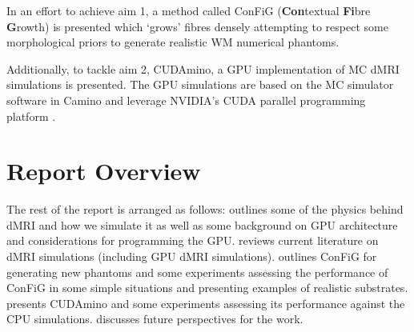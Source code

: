 In an effort to achieve aim 1, a method called \acs{ConFiG} (\textbf{Con}textual \textbf{Fi}bre \textbf{G}rowth) is presented which `grows' fibres densely attempting to respect some morphological priors to generate realistic \ac{WM} numerical phantoms.


Additionally, to tackle aim 2, CUDAmino, a \ac{GPU} implementation of \ac{MC} \ac{dMRI} simulations is presented. The \ac{GPU} simulations are based on the \ac{MC} simulator software in Camino \cite{Cook2006,Hall2009} and leverage NVIDIA's \acs{CUDA} parallel programming platform \cite{Nickolls2008}.




\section{Report Overview}
\label{sec:intro_report_overview}
The rest of the report is arranged as follows:  outlines some of the physics behind \acl{dMRI} and how we simulate it as well as some background on \ac{GPU} architecture and considerations for programming the \ac{GPU}.  reviews current literature on \ac{dMRI} simulations (including \ac{GPU} \ac{dMRI} simulations).  outlines \ac{ConFiG} for generating new phantoms and some experiments assessing the performance of \ac{ConFiG} in some simple situations and presenting examples of realistic substrates.  presents CUDAmino and some experiments assessing its performance against the \ac{CPU} simulations.  discusses future perspectives for the work.



